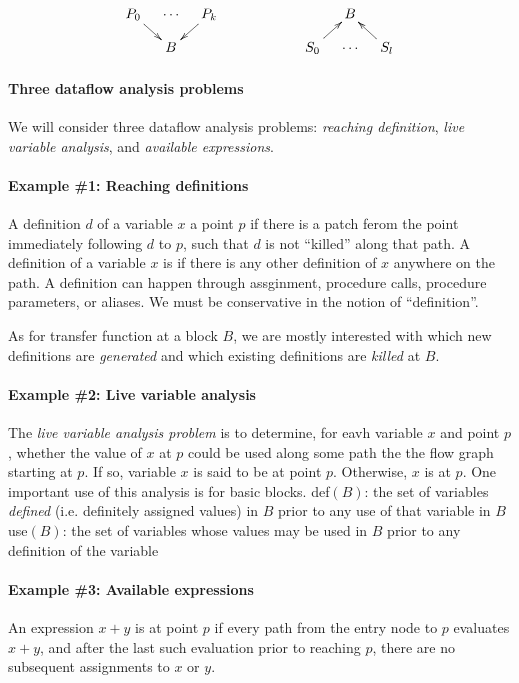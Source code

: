 \documentclass{memo}
\begin{document}
\[\xymatrix@-0.5cm{
  P_0 \ar[rd]& \cdots & P_k \ar[ld] &&&& &B\\
        &  B & &&&&  S_0 \ar[ru]& \cdots & S_l \ar[lu]
}\]

\paragraph{Three dataflow analysis problems}
We will consider three dataflow analysis problems: {\em reaching definition},
{\em live variable analysis\/}, and {\em available expressions}. 

\paragraph{Example \#1: Reaching definitions}
A definition $d$ of a variable $x$  a point $p$ if there is a
patch ferom the point immediately following $d$ to $p$, such that $d$ is not
``killed'' along that path. A definition of a variable $x$ is  if
there is any other definition of $x$ anywhere on the path. A definition can
happen through assginment, procedure calls, procedure parameters, or
aliases. We must be conservative in the notion of ``definition''. 

As for transfer function at a block $B$, we are mostly interested with which
new definitions are {\em generated\/} and which existing definitions are {\em
    killed\/} at $B$.

\paragraph{Example \#2: Live variable analysis}
The {\em live variable analysis problem\/} is to determine, for eavh variable
$x$ and point $p$, whether the value of $x$ at $p$ could be used along some
path the the flow graph starting at $p$. 
If so, variable $x$ is said to be  at point $p$. Otherwise, $x$ is
 at $p$. One important use of this analysis is  for basic blocks. 
\bit
\w def$(B)$: the set of variables {\em defined\/} (i.e. definitely assigned
values) in $B$ prior to any use of that variable in $B$
\w use$(B)$: the set of variables whose values may be used in $B$ prior to any
definition of the variable
\eit

\paragraph{Example \#3: Available expressions}
An expression $x + y$ is  at point $p$ if every path from the
entry node to $p$ evaluates $x + y$, and after the last such evaluation prior
to reaching $p$, there are no subsequent assignments to $x$ or $y$. 
\end{document}
